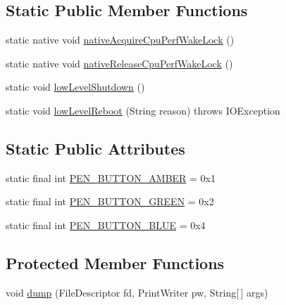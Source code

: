 \subsection*{Static Public Member Functions}
\begin{DoxyCompactItemize}
\item 
static native void \hyperlink{classcom_1_1android_1_1server_1_1power_1_1PowerManagerService_a46a637df6dae5ddc05b11c2328e8fe84}{native\-Acquire\-Cpu\-Perf\-Wake\-Lock} ()
\item 
static native void \hyperlink{classcom_1_1android_1_1server_1_1power_1_1PowerManagerService_ad615daf1f57b0513b021d424ff7ec50c}{native\-Release\-Cpu\-Perf\-Wake\-Lock} ()
\item 
static void \hyperlink{classcom_1_1android_1_1server_1_1power_1_1PowerManagerService_a3dc7ceb97425c68eeb6fe18f83afc962}{low\-Level\-Shutdown} ()
\item 
static void \hyperlink{classcom_1_1android_1_1server_1_1power_1_1PowerManagerService_a3b4db5d2610f8a9965621dfa38babba6}{low\-Level\-Reboot} (String reason)  throws I\-O\-Exception 
\end{DoxyCompactItemize}
\subsection*{Static Public Attributes}
\begin{DoxyCompactItemize}
\item 
static final int \hyperlink{classcom_1_1android_1_1server_1_1power_1_1PowerManagerService_a4bdc68fe4ad23e067adfab89adbf8fcd}{P\-E\-N\-\_\-\-B\-U\-T\-T\-O\-N\-\_\-\-A\-M\-B\-E\-R} = 0x1
\item 
static final int \hyperlink{classcom_1_1android_1_1server_1_1power_1_1PowerManagerService_a62f5f092486db1615d11b39369d3e5a1}{P\-E\-N\-\_\-\-B\-U\-T\-T\-O\-N\-\_\-\-G\-R\-E\-E\-N} = 0x2
\item 
static final int \hyperlink{classcom_1_1android_1_1server_1_1power_1_1PowerManagerService_a75196cf300a4f2c33a62046ad07c66e5}{P\-E\-N\-\_\-\-B\-U\-T\-T\-O\-N\-\_\-\-B\-L\-U\-E} = 0x4
\end{DoxyCompactItemize}
\subsection*{Protected Member Functions}
\begin{DoxyCompactItemize}
\item 
void \hyperlink{classcom_1_1android_1_1server_1_1power_1_1PowerManagerService_aa036665f6b9bb78bfb386f90b40a65e8}{dump} (File\-Descriptor fd, Print\-Writer pw, String\mbox{[}$\,$\mbox{]} args)
\end{DoxyCompactItemize}
